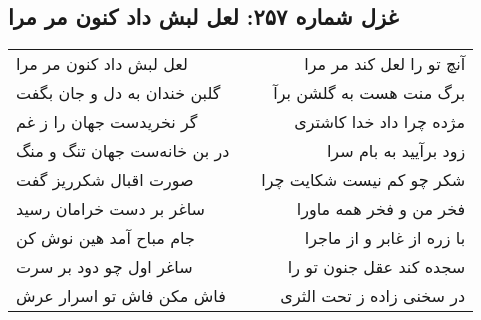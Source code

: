 \begin{center}
\section*{غزل شماره ۲۵۷: لعل لبش داد کنون مر مرا}
\label{sec:0257}
\begin{longtable}{l p{0.5cm} r}
لعل لبش داد کنون مر مرا
&&
آنچ تو را لعل کند مر مرا
\\
گلبن خندان به دل و جان بگفت
&&
برگ منت هست به گلشن برآ
\\
گر نخریدست جهان را ز غم
&&
مژده چرا داد خدا کاشتری
\\
در بن خانه‌ست جهان تنگ و منگ
&&
زود برآیید به بام سرا
\\
صورت اقبال شکرریز گفت
&&
شکر چو کم نیست شکایت چرا
\\
ساغر بر دست خرامان رسید
&&
فخر من و فخر همه ماورا
\\
جام مباح آمد هین نوش کن
&&
با زره از غابر و از ماجرا
\\
ساغر اول چو دود بر سرت
&&
سجده کند عقل جنون تو را
\\
فاش مکن فاش تو اسرار عرش
&&
در سخنی زاده ز تحت الثری
\\
\end{longtable}
\end{center}
